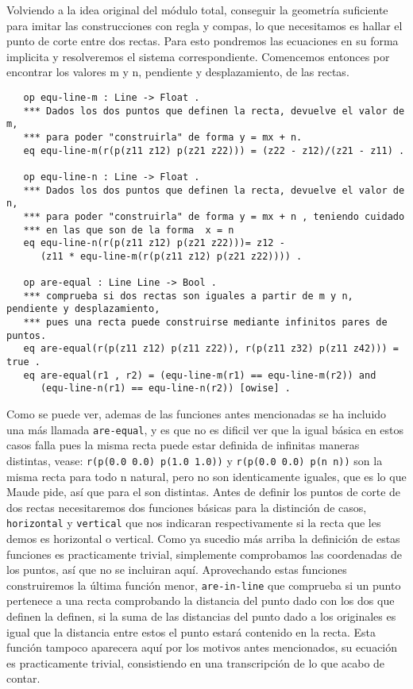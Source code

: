 Volviendo a la idea original del módulo total, conseguir la geometría suficiente para imitar las construcciones con regla y compas, lo que necesitamos es hallar el punto de corte entre dos rectas. Para esto pondremos las ecuaciones en su forma implicita y resolveremos el sistema correspondiente. Comencemos entonces por encontrar los valores m y n, pendiente y desplazamiento, de las rectas. \par

{\codesize
\begin{verbatim}
   op equ-line-m : Line -> Float .
   *** Dados los dos puntos que definen la recta, devuelve el valor de m, 
   *** para poder "construirla" de forma y = mx + n.
   eq equ-line-m(r(p(z11 z12) p(z21 z22))) = (z22 - z12)/(z21 - z11) .

   op equ-line-n : Line -> Float .
   *** Dados los dos puntos que definen la recta, devuelve el valor de n, 
   *** para poder "construirla" de forma y = mx + n , teniendo cuidado 
   *** en las que son de la forma  x = n
   eq equ-line-n(r(p(z11 z12) p(z21 z22)))= z12 - 
      (z11 * equ-line-m(r(p(z11 z12) p(z21 z22)))) .

   op are-equal : Line Line -> Bool .
   *** comprueba si dos rectas son iguales a partir de m y n, pendiente y desplazamiento, 
   *** pues una recta puede construirse mediante infinitos pares de puntos.
   eq are-equal(r(p(z11 z12) p(z11 z22)), r(p(z11 z32) p(z11 z42))) = true . 
   eq are-equal(r1 , r2) = (equ-line-m(r1) == equ-line-m(r2)) and 
      (equ-line-n(r1) == equ-line-n(r2)) [owise] .
\end{verbatim}
}

Como se puede ver, ademas de las funciones antes mencionadas se ha incluido una más llamada \texttt{are-equal}, y es que no es dificil ver que la igual básica en estos casos falla pues la misma recta puede estar definida de infinitas maneras distintas, vease: \texttt{r(p(0.0 0.0) p(1.0 1.0))} y \texttt{r(p(0.0 0.0) p(n n))} son la misma recta para todo n natural, pero no son identicamente iguales, que es lo que Maude pide, así que para el son distintas. Antes de definir los puntos de corte de dos rectas necesitaremos dos funciones básicas para la distinción de casos, \texttt{horizontal} y \texttt{vertical} que nos indicaran respectivamente si la recta que les demos es horizontal o vertical. Como ya sucedio más arriba la definición de estas funciones es practicamente trivial, simplemente comprobamos las coordenadas de los puntos, así que no se incluiran aquí. Aprovechando estas funciones construiremos la última función menor, \texttt{are-in-line} que comprueba si un punto pertenece a una recta comprobando la distancia del punto dado con los dos que definen la definen, si la suma de las distancias del punto dado a los originales es igual que la distancia entre estos el punto estará contenido en la recta. Esta función tampoco aparecera aquí por los motivos antes mencionados, su ecuación es practicamente trivial, consistiendo en una transcripción de lo que acabo de contar.\par


